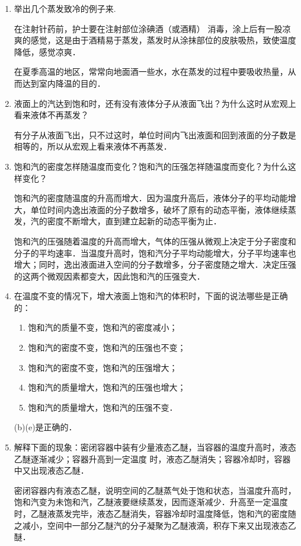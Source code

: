 \begin{enumerate}
    \item 举出几个蒸发致冷的例子来.
    
    \begin{solution}
在注射针药前，护士要在注射部位涂碘酒（或酒精）
消毒，涂上后有一股凉爽的感觉，这是由于酒精易于蒸发，蒸发时从涂抹部位的皮肤吸热，致使温度降低，感觉凉爽．

在夏季高温的地区，常常向地面酒一些水，水在蒸发的过程中要吸收热量，从而达到室内降温的目的．      
    \end{solution}
\item 液面上的汽达到饱和时，还有没有液体分子从液面飞出？为什么这时从宏观上看来液体不再蒸发？
    
\begin{solution}
有分子从液面飞出，只不过这时，单位时间内飞出液面和回到液面的分子数是相等的，所以从宏观上看来液体不再蒸发．
\end{solution}
\item 饱和汽的密度怎样随温度而变化？饱和汽的压强怎祥随温度而变化？为什么这样变化？
    
\begin{solution}
饱和汽的密度随温度的升高而增大．因为温度升高后，液体分子的平均动能增大，单位时间内逸出液面的分子数增多，破坏了原有的动态平衡，液体继续蒸发，汽的密度不断增大，直到建立起新的动态平衡为止．

饱和汽的压强随着温度的升高而增大，气体的压强从微观上决定于分子密度和分子的平均速率．当温度升高时，饱和汽分子平均动能增大，分子平均速率也增大；同时，逸出液面进入空间的分子数增多，分子密度随之增大．决定压强的这两个微观因素都变大，因此饱和汽的压强变大．
\end{solution}
\item 在温度不变的情况下，增大液面上饱和汽的体积时，下面的说法哪些是正确的：
\begin{enumerate}
    \item 饱和汽的质量不变，饱和汽的密度减小；
    \item 饱和汽的密度不变，饱和汽的压强也不变；
    \item 饱和汽的密度不变，饱和汽的压强增大；
    \item 饱和汽的质量增大，饱和汽的压强也增大；
    \item 饱和汽的质量增大，饱和汽的压强不变．
\end{enumerate}

    
\begin{solution}
  (b)(e)是正确的．
\end{solution}
\item 解释下面的现象：密闭容器中装有少量液态乙醚，当容器的温度升高时，液态乙醚逐渐减少；容器升高到一定温度
时，液态乙醚消失；容器冷却时，容器中又出现液态乙醚．
    
\begin{solution}
  密闭容器内有液态乙醚，说明空间的乙醚蒸气处于饱和状态，当温度升高时，饱和汽变为未饱和汽，乙醚液要继续蒸发，因而逐渐减少．升高至一定温度时，乙醚液蒸发完毕，液态乙醚消失，容器冷却时温度降低，饱和汽的密度随之减小，空间中一部分乙醚汽的分子凝聚为乙醚液滴，积存下来又出现液态乙醚．
\end{solution}
\end{enumerate}




